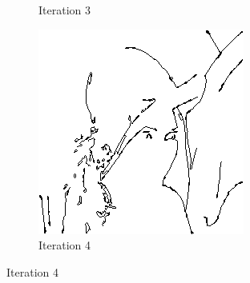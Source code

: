 \documentclass{llncs}
\begin{document}
\begin{figure}
\begin{subfigure}[b]{0.3\textwidth}
                \caption{Iteration 3}
                \label{fig:search_iter3}
        \end{subfigure}
        \quad
        \begin{subfigure}[b]{0.3\textwidth}
                \includegraphics[width=\textwidth]{IMG/ImprovedSearch/Iteration4}
                \caption{Iteration 4}
                \label{fig:search_iter4}
        \end{subfigure}
        
        \vspace{5mm}
        

\end{figure}
\end{document}
